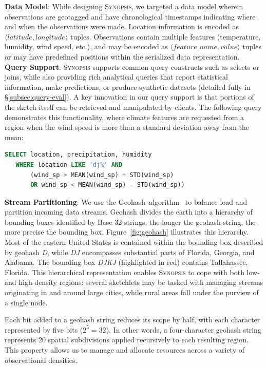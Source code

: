 %
\textbf{Data Model}:
While designing \textsc{Synopsis}, we targeted a data model wherein observations are geotagged and have chronological timestamps indicating where and when the observations were made. Location information is encoded as $\langle latitude, longitude \rangle$ tuples. Observations contain multiple features (temperature, humidity, wind speed, etc.), and may be encoded as $\langle feature\_name, value \rangle$ tuples or may have predefined positions within the serialized data representation. 
%
\vspace{0.7em}\\
%
\textbf{Query Support}:
\textsc{Synopsis} supports common query constructs such as selects or joins, while also providing rich analytical queries that report statistical information, make predictions, or produce synthetic datasets (detailed fully in \S\ref{subsec:query-eval}). A key innovation in our query support is that portions of the sketch itself can be retrieved and manipulated by clients. The following query demonstrates this functionality, where climate features are requested from a region when the wind speed is more than a standard deviation away from the mean:

\begin{lstlisting}[language=SQL,style=custompy]
   SELECT location, precipitation, humidity
   WHERE location LIKE 'dj%' AND
       (wind_sp > MEAN(wind_sp) + STD(wind_sp)
       OR wind_sp < MEAN(wind_sp) - STD(wind_sp))
\end{lstlisting}
%
%
\textbf{Stream Partitioning}:
We use the Geohash~algorithm~\cite{geohash} to balance load and partition incoming data streams. Geohash divides the earth into a hierarchy of bounding boxes identified by Base 32 strings; the longer the geohash string, the more precise the bounding box. Figure~\ref{fig:geohash} illustrates this hierarchy. Most of the eastern United States is contained within the bounding box described by geohash \emph{D}, while \emph{DJ} encompasses substantial parts of Florida, Georgia, and Alabama. The bounding box \emph{DJKJ} (highlighted in red) contains Tallahassee, Florida. This hierarchical representation enables \textsc{Synopsis} to cope with both low- and high-density regions: several sketchlets may be tasked with managing streams originating in and around large cities, while rural areas fall under the purview of a single node.

Each bit added to a geohash string reduces its scope by half, with each character represented by five bits ($2^5 = 32$). In other words, a four-character geohash string represents 20 spatial subdivisions applied recursively to each resulting region. This property allows us to manage and allocate resources across a variety of observational densities.

